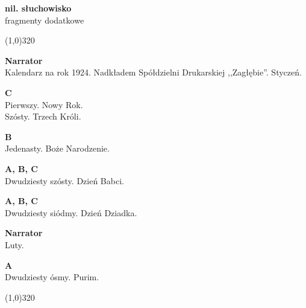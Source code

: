 \documentclass[11pt,a4paper,oneside]{article}
\begin{document}
\noindent
\textbf{nil. słuchowisko}\\
fragmenty dodatkowe
 
\line(1,0){320}

\textbf{Narrator}\\
Kalendarz na rok 1924. Nadkładem Spółdzielni Drukarskiej 
,,Zagłębie''. Styczeń.

\textbf{C}\\
Pierwszy. Nowy Rok. \\
Szósty. Trzech Króli.

\textbf{B}\\
Jedenasty. Boże Narodzenie.

\textbf{A, B, C}\\
Dwudziesty szósty. Dzień Babci.

\textbf{A, B, C}\\
Dwudziesty siódmy. Dzień Dziadka.

\textbf{Narrator}\\
Luty.

\textbf{A}\\
Dwudziesty ósmy. Purim.

\line(1,0){320}
\end{document}
